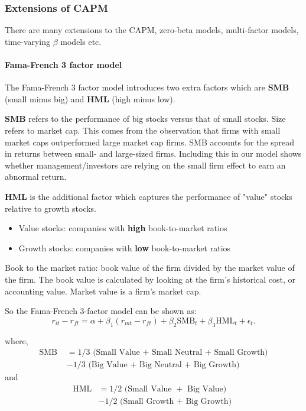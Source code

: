 \documentclass[11pt]{article}
\begin{document}
\subsubsection{Extensions of CAPM}
There are many extensions to the CAPM, zero-beta models, multi-factor models, time-varying $\beta$ models etc. 

\paragraph{Fama-French 3 factor model} \mbox{}

The Fama-French 3 factor model introduces two extra factors which are \textbf{SMB} (small minus big) and \textbf{HML} (high minus low).

\textbf{SMB} refers to the performance of big stocks versus that of small stocks. Size refers to market cap. This comes from the observation that firms with small market caps outperformed large market cap firms. SMB accounts for the spread in returns between small- and large-sized firms. Including this in our model shows whether management/investors are relying on the small firm effect to earn an abnormal return.

\textbf{HML} is the additional factor which captures the performance of "value" stocks relative to growth stocks.
\begin{itemize}
    \item Value stocks: companies with \textbf{high} book-to-market ratios
    \item Growth stocks: companies with \textbf{low} book-to-market ratios
\end{itemize}

Book to the market ratio: book value of the firm divided by the market value of the firm. The book value is calculated by looking at the firm's historical cost, or accounting value. Market value is a firm's market cap.

So the Fama-French 3-factor model can be shown as:
\begin{equation}
r_{i t}-r_{f t}=\alpha+\beta_1\left(r_{m t}-r_{f t}\right)+\beta_2 \mathrm{SMB}_t+\beta_3 \mathrm{HML}_t+\epsilon_t .
\end{equation}

where,
\begin{equation}
\begin{aligned}
\text { SMB } & =1 / 3 \text { (Small Value + Small Neutral + Small Growth) } \\
& -1 / 3 \text { (Big Value + Big Neutral + Big Growth) }
\end{aligned}
\end{equation}
and
\begin{equation}
\begin{aligned}
\mathrm{HML} & =1 / 2 \text { (Small Value }+ \text { Big Value) } \\
& -1 / 2 \text { (Small Growth + Big Growth) }
\end{aligned}
\end{equation}
\end{document}
